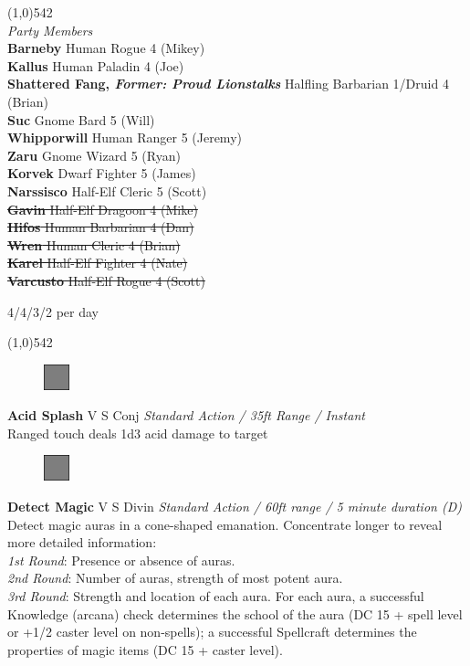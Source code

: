 \documentclass[letterpaper]{article}
\newcommand{\fullline}{\noindent\line(1,0){542} \\}
\newcommand{\spell}[7]{
\begin{figure}
\vspace{-13pt}
\ifstrequal{#2}{Full}{\includegraphics[width=2em]{Checkbox-Full}}{
                      \includegraphics[width=2em]{Checkbox}}
\ifstrequal{#7}{}{\vspace{-1em}}{\vspace{#7}}
\end{figure}
\noindent \textbf{#1} #3 {
    \ifstrequal{#4}{Conj}{\color{Plum}Conj}{%
    \ifstrequal{#4}{Divin}{\color{YellowOrange}Divin}{%
    \ifstrequal{#4}{Ench}{\color{VioletRed}Ench}{%
    \ifstrequal{#4}{Trans}{\color{LimeGreen}Trans}{%
    \ifstrequal{#4}{Evoc}{\color{RedOrange}Evoc}{%
    \ifstrequal{#4}{Illu}{\color{ProcessBlue}Illu}{%
    \ifstrequal{#4}{Abjur}{\color{CadetBlue}Abjur}{%
    \ifstrequal{#4}{Necro}{\color{Red}Necro}{%
}}}}}}}}}
{\footnotesize \emph{#5}} \\
#6
}
\begin{document}
\fullline
\noindent\emph{Party Members} \\
\textbf{Barneby} Human Rogue 4 (Mikey) \\
\textbf{Kallus} Human Paladin 4 (Joe) \\
\textbf{Shattered Fang, \emph{Former: Proud Lionstalks}} Halfling Barbarian 1/Druid 4 (Brian) \\
\textbf{Suc} Gnome Bard 5 (Will) \\
\textbf{Whipporwill} Human Ranger 5 (Jeremy) \\
\textbf{Zaru} Gnome Wizard 5 (Ryan) \\
\textbf{Korvek} Dwarf Fighter 5 (James) \\
\textbf{Narssisco} Half-Elf Cleric 5 (Scott) \\
\sout{\textbf{Gavin} Half-Elf Dragoon 4 (Mike)}\\
\sout{\textbf{Hifos} Human Barbarian 4 (Dan)} \\
\sout{\textbf{Wren} Human Cleric 4 (Brian)} \\
\sout{\textbf{Karel} Half-Elf Fighter 4 (Nate)} \\
\sout{\textbf{Varcusto} Half-Elf Rogue 4 (Scott)} \\

\pagebreak

 \hspace{2em}4/4/3/2 per day\par
\vspace{-0.5em}
\fullline
\vspace{-1.25em}

\spell{Acid Splash}{Full}{V S}{Conj}{Standard Action / 35ft Range / Instant}{
Ranged touch deals 1d3 acid damage to target}{}\\[-1em] %


\spell{Detect Magic}{Full}{V S}{Divin}{Standard Action / 60ft range / 5 minute duration (D)}{
Detect magic auras in a cone-shaped emanation.  Concentrate longer to reveal more detailed information:\\
\emph{1st Round}: Presence or absence of auras.\\
\emph{2nd Round}: Number of auras, strength of most potent aura.\\
\emph{3rd Round}: Strength and location of each aura.  For each aura, a successful Knowledge (arcana) check determines the school of the aura (DC 15 + spell level or +1/2 caster level on non-spells); a successful Spellcraft determines the properties of magic items (DC 15 + caster level).}{3em} %
\end{document}
